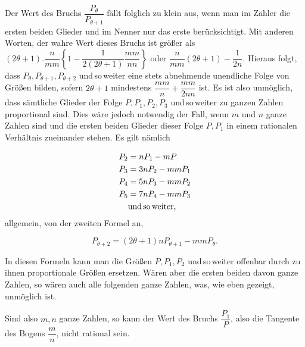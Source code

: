 
Der Wert des Bruchs $\dfrac{P_\theta}{P_{\theta+1}}$ fällt folglich zu klein aus,
wenn man im Zähler die ersten beiden Glieder und im Nenner nur das erste
berücksichtigt. Mit anderen Worten, der wahre Wert dieses Bruchs ist größer als
$(2\theta+1) . \dfrac{n}{mm}\left\{1-\dfrac{1}{2(2\theta+1)}\dfrac{mm}{nn}\right\}$ oder
$\dfrac{n}{mm}(2\theta+1)-\dfrac{1}{2n}$. 
Hieraus folgt, dass $P_\theta, P_{\theta+1}, P_{\theta+2}$ und\,so\,weiter eine stets
abnehmende unendliche Folge von Größen bilden, sofern $2\theta+1$ mindestens
$\dfrac{mm}{n}+\dfrac{mm}{2nn}$ ist. Es ist also unmöglich, dass sämtliche Glieder der Folge
$P, P_1, P_2, P_3$ und\,so\,weiter zu ganzen Zahlen proportional sind. Dies wäre jedoch
notwendig der Fall, wenn $m$ und $n$ ganze Zahlen sind und
die ersten beiden Glieder dieser Folge $P, P_1$ in einem rationalen
Verhältnis zueinander stehen. Es gilt nämlich

\[
\begin{aligned}
P_2 &= nP_1 - mP\\
P_3 &= 3nP_2 - mmP_1\\
P_4 &= 5nP_3 - mmP_2\\
P_5 &= 7nP_4 - mmP_3\\
&\text{und\,so\,weiter,}
\end{aligned}
\]
\noindent allgemein, von der zweiten Formel an,

\[
P_{\theta+2} = (2\theta+1)nP_{\theta+1} - mmP_\theta.
\]

In diesen Formeln kann man die Größen $P, P_1, P_2$ und\,so\,weiter offenbar durch
zu ihnen proportionale Größen ersetzen. Wären aber die ersten beiden davon ganze Zahlen,
so wären auch alle folgenden ganze Zahlen, was, wie eben gezeigt, unmöglich ist.

Sind also $m, n$ ganze Zahlen, so kann der Wert des Bruchs
$\dfrac{P_1}{P}$, also die Tangente des Bogens
$\dfrac{m}{n}$, nicht rational sein.
